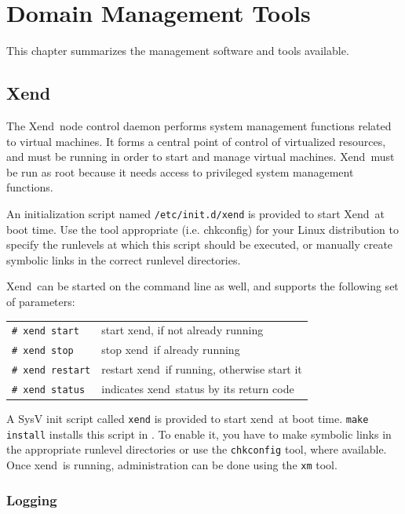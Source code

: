 \documentclass[11pt,twoside,final,openright]{report}
\def\Xend{{Xend}\xspace}
\def\xend{{xend}\xspace}
\begin{document}
\chapter{Domain Management Tools}

This chapter summarizes the management software and tools available.


\section{\Xend\ }
\label{s:xend}


The \Xend\ node control daemon performs system management functions
related to virtual machines. It forms a central point of control of
virtualized resources, and must be running in order to start and manage
virtual machines. \Xend\ must be run as root because it needs access to
privileged system management functions.

An initialization script named \texttt{/etc/init.d/xend} is provided to
start \Xend\ at boot time. Use the tool appropriate (i.e. chkconfig) for
your Linux distribution to specify the runlevels at which this script
should be executed, or manually create symbolic links in the correct
runlevel directories.

\Xend\ can be started on the command line as well, and supports the
following set of parameters:

\begin{tabular}{ll}
  \verb!# xend start! & start \xend, if not already running \\
  \verb!# xend stop!  & stop \xend\ if already running       \\
  \verb!# xend restart! & restart \xend\ if running, otherwise start it \\
  \verb!# xend status! & indicates \xend\ status by its return code
\end{tabular}

A SysV init script called {\tt xend} is provided to start \xend\ at
boot time. {\tt make install} installs this script in
. To enable it, you have to make symbolic links in
the appropriate runlevel directories or use the {\tt chkconfig} tool,
where available.  Once \xend\ is running, administration can be done
using the \texttt{xm} tool.

\subsection{Logging}
\end{document}
